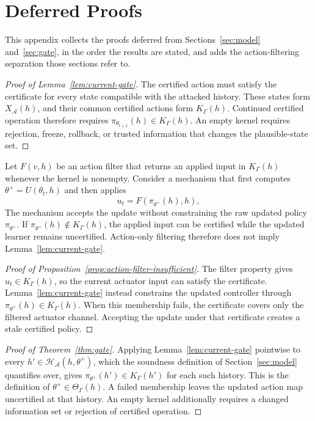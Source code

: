 \section{Deferred Proofs}
\label{sec:appendix-proofs}

This appendix collects the proofs deferred from Sections~\ref{sec:model}
and~\ref{sec:gate}, in the order the results are stated, and adds the
action-filtering separation those sections refer to.

\begin{proof}[Proof of Lemma~\ref{lem:current-gate}]
The certified action must satisfy the certificate for every state compatible
with the attacked history.  These states form $X_{\mathcal A}(h)$, and their
common certified actions form $K_\Gamma(h)$.  Continued certified operation
therefore requires $\pi_{\theta_{t+1}}(h)\in K_\Gamma(h)$.  An empty kernel
requires rejection, freeze, rollback, or trusted information that changes the
plausible-state set.
\end{proof}

\begin{proposition}
\label{prop:action-filter-insufficient}
Let $F(v,h)$ be an action filter that returns an applied input in
$K_\Gamma(h)$ whenever the kernel is nonempty.  Consider a mechanism that
first computes $\theta^+=U(\theta_t,h)$ and then applies
\begin{equation}
    u_t=F(\pi_{\theta^+}(h),h),
\end{equation}
The mechanism accepts the update without constraining the raw updated policy
$\pi_{\theta^+}$.  If $\pi_{\theta^+}(h)\notin K_\Gamma(h)$, the applied input
can be certified while the updated learner remains uncertified.  Action-only
filtering therefore does not imply Lemma~\ref{lem:current-gate}.
\end{proposition}

\begin{proof}[Proof of Proposition~\ref{prop:action-filter-insufficient}]
The filter property gives $u_t\in K_\Gamma(h)$, so the current actuator input
can satisfy the certificate.  Lemma~\ref{lem:current-gate} instead constrains
the updated controller through
$\pi_{\theta^+}(h)\in K_\Gamma(h)$.  When this membership fails, the
certificate covers only the filtered actuator channel.  Accepting the update
under that certificate creates a stale certified policy.
\end{proof}

\begin{proof}[Proof of Theorem~\ref{thm:gate}]
Applying Lemma~\ref{lem:current-gate} pointwise to every
$h'\in\mathcal H_{\mathcal A}(h,\theta^+)$, which the soundness definition of
Section~\ref{sec:model} quantifies over, gives
$\pi_{\theta^+}(h')\in K_\Gamma(h')$ for each such history.  This is the
definition of $\theta^+\in\Theta_\Gamma(h)$.  A failed membership leaves the
updated action map uncertified at that history.  An empty kernel additionally
requires a changed information set or rejection of certified operation.
\end{proof}

